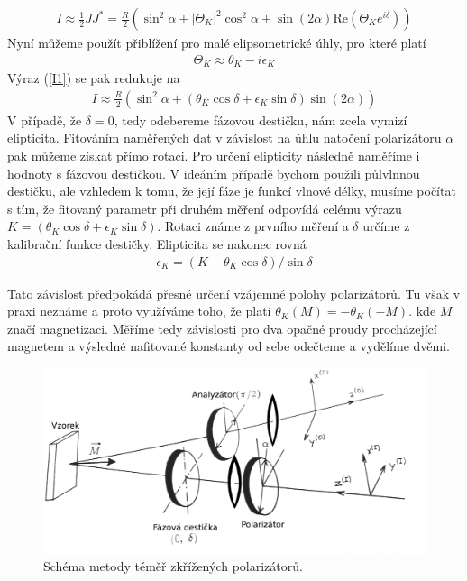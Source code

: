 \begin{eqnarray}
I\approx\frac{1}{2}JJ^*=\frac{R}{2}(\sin^2\alpha+|\Theta_K|^2\cos^2\alpha+\sin(2\alpha)\mbox{Re}(\Theta_Ke^{i\delta}))
\label{I1}
\end{eqnarray}
Nyní můžeme použít přiblížení pro malé elipsometrické úhly, pro které platí
\begin{eqnarray}
\Theta_K\approx\theta_K-i\epsilon_K
\end{eqnarray}
Výraz (\ref{I1}) se pak redukuje na
\begin{eqnarray}
I\approx\frac{R}{2}(\sin^2\alpha+(\theta_K\cos\delta+\epsilon_K\sin\delta)\sin(2\alpha))
\label{I2}
\end{eqnarray}
V  případě, že $\delta=0$, tedy odebereme fázovou destičku, nám zcela vymizí elipticita. Fitováním naměřených dat v závislost na úhlu natočení polarizátoru $\alpha$ pak můžeme získat přímo rotaci. Pro určení elipticity následně naměříme i hodnoty s fázovou destičkou. V ideáním případě bychom použili půlvlnnou destičku, ale vzhledem k tomu, že její fáze je funkcí vlnové délky, musíme počítat s tím, že fitovaný parametr při druhém měření odpovídá celému výrazu $K=(\theta_K\cos\delta+\epsilon_K\sin\delta)$. Rotaci známe z prvního měření a $\delta$ určíme z kalibrační funkce destičky. Elipticita se nakonec rovná
\begin{eqnarray}
\epsilon_K=(K-\theta_K\cos\delta)/\sin\delta
\end{eqnarray}

Tato závislost předpokádá přesné určení vzájemné polohy polarizátorů. Tu však v praxi neznáme a proto využíváme toho, že platí $\theta_K(M)=-\theta_K(-M)$. kde $M$ značí magnetizaci. Měříme tedy závislosti pro dva opačné proudy procházející magnetem a výsledné nafitované konstanty od sebe odečteme a vydělíme dvěmi.

\begin{figure}
    \includegraphics[width=5in]{img/TPEschema.eps}
    \caption{Schéma metody téměř zkřížených polarizátorů.}
    \label{Schema TPE}
\end{figure}

